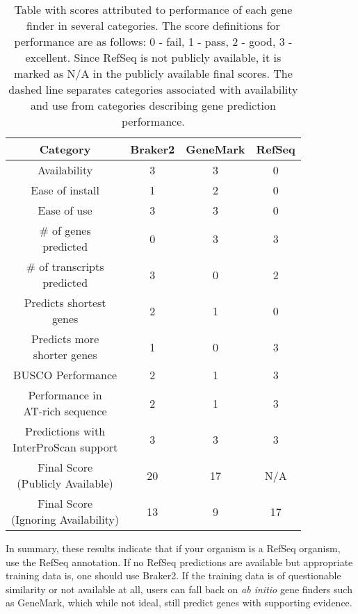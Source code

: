 \begin{table}
  \centering
  \begin{tabular}{|c|c|c|c|}
    \hline
    Category & Braker2 & GeneMark & RefSeq \\ \hline
    Availability & 3 & 3 & 0 \\ \hline
    Ease of install & 1 & 2 & 0 \\ \hline
    Ease of use & 3 & 3 & 0 \\ \hdashline
    \makecell{\# of genes\\predicted} & 0 & 3 & 3 \\ \hline
    \makecell{\# of transcripts\\predicted} & 3 & 0 & 2 \\ \hline
    \makecell{Predicts shortest\\genes} & 2 & 1 & 0 \\ \hline
    \makecell{Predicts more\\shorter genes} & 1 & 0 & 3 \\ \hline
    BUSCO Performance & 2 & 1 & 3 \\ \hline
    \makecell{Performance in\\AT-rich sequence} & 2 & 1 & 3 \\ \hline
    \makecell{Predictions with \\InterProScan support} & 3 & 3 & 3 \\ \hline
    \makecell{Final Score\\(Publicly Available)} & 20 & 17 & N/A \\ \hline
    \makecell{Final Score\\(Ignoring Availability)} & 13 & 9 & 17 \\ \hline
  \end{tabular}
  \caption[Final scoring table]{Table with scores attributed to
    performance of each gene finder in several categories. The score
    definitions for performance are as follows: 0 - fail, 1 - pass, 2
    - good, 3 - excellent. Since RefSeq is not publicly available, it is
    marked as N/A in the publicly available final scores. The dashed
    line separates categories associated with availability and use
    from categories describing gene prediction performance.}
  \label{table:final-score}
\end{table}

In summary, these results indicate that if your organism is a RefSeq
organism, use the RefSeq annotation. If no RefSeq predictions are
available but appropriate training data is, one should use Braker2. If
the training data is of questionable similarity or not available at
all, users can fall back on \textit{ab initio} gene finders such as
GeneMark, which while not ideal, still predict genes with supporting
evidence.
